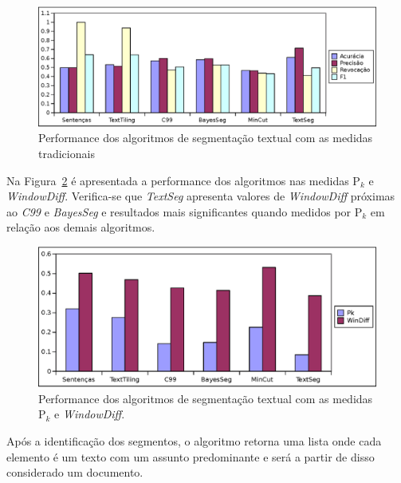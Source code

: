 
  \begin{figure}[!h]
	  \centering
	  \includegraphics[width=1\textwidth]{conteudo/capitulos/figs/grafico-medidas-APRF1.eps}
	  \caption{Performance dos algoritmos de segmentação textual com as medidas tradicionais}
	  \label{fig:grafico-medidas-tradicionais}
  \end{figure}
  

Na Figura~\ref{fig:grafico-medidas-Pk-Wd} é apresentada a performance dos algoritmos nas medidas P$_k$ e \textit{WindowDiff}. Verifica-se que \textit{TextSeg} apresenta valores de \textit{WindowDiff} próximas ao \textit{C99} e \textit{BayesSeg} e resultados mais significantes quando medidos por P$_k$ em relação aos demais algoritmos.



  \begin{figure}[!h]
	  \centering
	  \includegraphics[width=1\textwidth]{conteudo/capitulos/figs/grafico-medidas-Pk-Wd.eps}
	  \caption{Performance dos algoritmos de segmentação textual com as medidas P$_k$ e \textit{WindowDiff}.}
	  \label{fig:grafico-medidas-Pk-Wd}
  \end{figure}












Após a identificação dos segmentos, o algoritmo retorna uma lista onde cada elemento é um texto com um assunto predominante e será a partir de disso considerado um documento.

